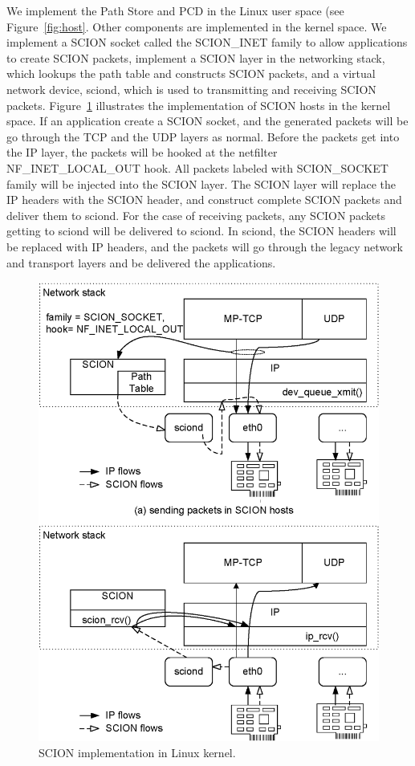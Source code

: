 We implement the Path Store and PCD in the Linux user space (see
Figure~\ref{fig:host}. Other components are implemented in the
kernel space. We implement a SCION socket called the SCION\_INET
family to allow applications to create SCION packets, implement a
SCION layer in the networking stack, which lookups the path table
and constructs SCION packets, and a virtual network device, sciond,
which is used to transmitting and receiving SCION packets.
Figure~\ref{fig:kernel} illustrates the implementation of SCION
hosts in the kernel space. If an application create a SCION socket,
and the generated packets will be go through the TCP and the UDP
layers as normal. Before the packets get into the IP layer, the
packets will be hooked at the netfilter NF\_INET\_LOCAL\_OUT hook.
All packets labeled with SCION\_SOCKET family will be injected into
the SCION layer. The SCION layer will replace the IP headers with
the SCION header, and construct complete SCION packets and deliver
them to sciond. For the case of receiving packets, any SCION packets
getting to sciond will be delivered to sciond. In sciond, the SCION
headers will be replaced with IP headers, and the packets will go
through the legacy network and transport layers and be delivered the
applications.

\begin{figure}[ht]
\centering
\begin{minipage}{0.65\textwidth}
\includegraphics[width=1\columnwidth]{./fig/host_kernel.eps}
\end{minipage}
\caption{SCION implementation in Linux kernel.}\label{fig:kernel}
\end{figure}

